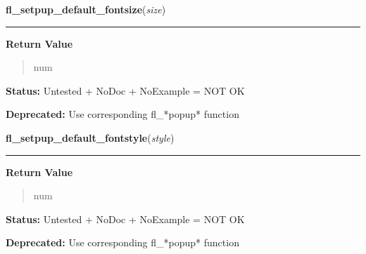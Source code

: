     \vspace{0.5ex}

\hspace{.8\funcindent}\begin{boxedminipage}{\funcwidth}

    \raggedright \textbf{fl\_setpup\_default\_fontsize}(\textit{size})

    \vspace{-1.5ex}

    \rule{\textwidth}{0.5\fboxrule}
\setlength{\parskip}{2ex}
\setlength{\parskip}{1ex}
      \textbf{Return Value}
    \vspace{-1ex}

      \begin{quote}
      num

      \end{quote}

\textbf{Status:} Untested + NoDoc + NoExample = NOT OK



\textbf{Deprecated:} Use corresponding fl\_*popup* function



    \end{boxedminipage}

    \label{xformslib:library:fl_setpup_default_fontstyle}

    \vspace{0.5ex}

\hspace{.8\funcindent}\begin{boxedminipage}{\funcwidth}

    \raggedright \textbf{fl\_setpup\_default\_fontstyle}(\textit{style})

    \vspace{-1.5ex}

    \rule{\textwidth}{0.5\fboxrule}
\setlength{\parskip}{2ex}
\setlength{\parskip}{1ex}
      \textbf{Return Value}
    \vspace{-1ex}

      \begin{quote}
      num

      \end{quote}

\textbf{Status:} Untested + NoDoc + NoExample = NOT OK



\textbf{Deprecated:} Use corresponding fl\_*popup* function



    \end{boxedminipage}

